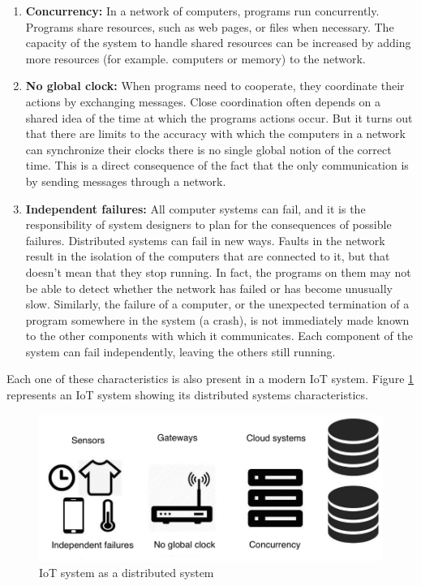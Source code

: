 \begin{enumerate}

\item \textbf{Concurrency:} 
In a network of computers, programs run concurrently. Programs share resources,
such as web pages, or files when necessary. The capacity of the system to handle
shared resources can be increased by adding more resources (for example.
computers or memory) to the network.

\item \textbf{No global clock:}
When programs need to cooperate, they coordinate their actions
by exchanging messages. Close coordination often depends on a shared idea of
the time at which the programs actions occur. But it turns out that there are
limits to the accuracy with which the computers in a network can synchronize
their clocks there is no single global notion of the correct time. This is a
direct consequence of the fact that the only communication is by sending
messages through a network.

\item \textbf{Independent failures:}
All computer systems can fail, and it is the
responsibility of system designers to plan for the consequences of possible
failures. Distributed systems can fail in new ways. Faults in the network
result in the isolation of the computers that are connected to it, but that
doesn't mean that they stop running. In fact, the programs on them may not be
able to detect whether the network has failed or has become unusually slow.
Similarly, the failure of a computer, or the unexpected termination of a
program somewhere in the system (a crash), is not immediately made known to the
other components with which it communicates. Each component of the system can
fail independently, leaving the others still running.

\end{enumerate}

Each one of these characteristics is also present in a modern IoT system. 
Figure \ref{fig:3.1} represents an IoT system showing its distributed systems
characteristics. 

\begin{figure}[H]
\centering
\includegraphics[width=1\textwidth]{images/IoT_distributed.jpeg}
\caption{IoT system as a distributed system}
\label{fig:3.1}
\end{figure}


